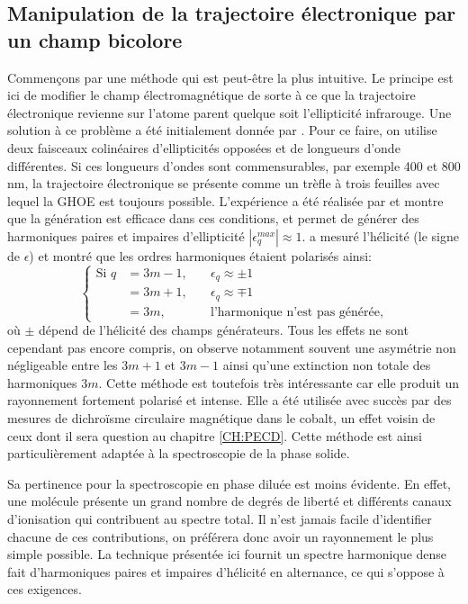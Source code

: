 \subsection{Manipulation de la trajectoire électronique par un champ bicolore}
Commençons par une méthode qui est peut-être la plus intuitive. Le principe est ici de modifier le champ électromagnétique de sorte à ce que la trajectoire électronique revienne sur l'atome parent quelque soit l'ellipticité infrarouge. Une solution à ce problème a été initialement donnée par . Pour ce faire, on utilise deux faisceaux colinéaires d’ellipticités opposées et de longueurs d'onde différentes. Si ces longueurs d'ondes sont commensurables, par exemple 400 et 800 nm, la trajectoire électronique se présente comme un trèfle à trois feuilles avec lequel la GHOE est toujours possible. L'expérience a été réalisée par  et montre que la génération est efficace dans ces conditions, et permet de générer des harmoniques paires et impaires d'ellipticité $|\epsilon^{max}_q|\approx 1$.  a mesuré l'hélicité (le signe de $\epsilon$) et montré que les ordres harmoniques étaient polarisés ainsi:
\[\left\{
\begin{aligned}
  \text{Si }q&=3m-1,\quad &\epsilon_q \approx \pm 1 \\
	&=3m+1, &\epsilon_q \approx \mp 1 \\
	&=3m, &\text{l'harmonique n'est pas générée},
\end{aligned}
\right.\]
où $\pm$ dépend de l'hélicité des champs générateurs. Tous les effets ne sont cependant pas encore compris, on observe notamment souvent une asymétrie non négligeable entre les $3m+1$ et $3m-1$ ainsi qu'une extinction non totale des harmoniques $3m$.
Cette méthode est toutefois très intéressante car elle produit un rayonnement fortement polarisé et intense. Elle a été utilisée avec succès par  des mesures de dichroïsme circulaire magnétique dans le cobalt, un effet voisin de ceux dont il sera question au chapitre \ref{CH:PECD}. Cette méthode est ainsi particulièrement adaptée à la spectroscopie de la phase solide.\par
Sa pertinence pour la spectroscopie en phase diluée est moins évidente. En effet, une molécule présente un grand nombre de degrés de liberté et différents canaux d'ionisation qui contribuent au spectre total. Il n'est jamais facile d'identifier chacune de ces contributions, on préférera donc avoir un rayonnement le plus simple possible.
La technique présentée ici fournit un spectre harmonique dense fait d'harmoniques paires et impaires d'hélicité en alternance, ce qui s'oppose à ces exigences.

